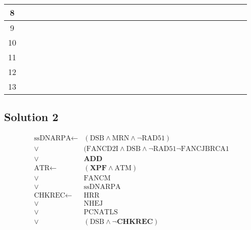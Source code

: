 \documentclass[a4paper,10pt]{article}
\begin{document}
\begin{table}
\begin{tabular}{|c|c|c|c|c|c|c|c|c|c|c|c|c|c|c|c|c|c|c|c|c|c|c|c|c|c|c|c|c|}
{\small 8} &  &  &  &  &  &  &  &  & \cellcolor{gray} & \cellcolor{gray} &  &  &  &  &  &  &  &  &  & \cellcolor{gray} &  &  & \cellcolor{gray} & \cellcolor{gray} &  &  &  &  \\ \hline
{\small 9} &  &  &  &  &  &  &  &  &  &  &  &  &  & \cellcolor{gray} &  &  &  & \cellcolor{gray} &  &  & \cellcolor{gray} & \cellcolor{gray} &  &  &  &  &  & \cellcolor{gray} \\ \hline
{\small 10} &  &  &  &  &  &  &  &  &  &  &  &  &  &  &  &  &  &  &  &  & \cellcolor{gray} &  &  &  &  &  &  &  \\ \hline
{\small 11} &  &  &  &  &  &  &  &  &  &  &  &  &  &  &  &  &  &  &  &  &  &  &  &  & \cellcolor{gray} & \cellcolor{gray} &  & \cellcolor{gray} \\ \hline
{\small 12} &  &  &  &  &  &  &  &  &  &  &  &  &  &  &  &  &  &  &  &  &  &  &  &  &  &  &  &  \\ \hline
{\small 13} &  &  &  &  &  &  &  &  &  &  &  &  &  &  &  &  &  &  &  &  &  &  &  &  &  &  &  & \cellcolor{gray} \\ \hline
\end{tabular}\end{table}
\FloatBarrier
\subsection{Solution 2}

\begin{align*}
 \textrm{ssDNARPA} \leftarrow &(\textrm{DSB} \land \textrm{MRN} \land \neg \textrm{RAD51}) \\
 \lor &(\textrm{FANCD2I} \land \textrm{DSB} \land \neg \textrm{RAD51} \neg \textrm{FANCJBRCA1} \\
 \lor &\mathbf{ADD} \\
 \textrm{ATR} \leftarrow &(\mathbf{XPF} \land \textrm{ATM}) \\
 \lor &\textrm{FANCM} \\
 \lor &\textrm{ssDNARPA} \\
 \textrm{CHKREC} \leftarrow &\textrm{HRR} \\
 \lor &\textrm{NHEJ} \\
 \lor &\textrm{PCNATLS} \\
 \lor &(\textrm{DSB} \land \mathbf{\neg CHKREC})
\end{align*}
\end{document}
